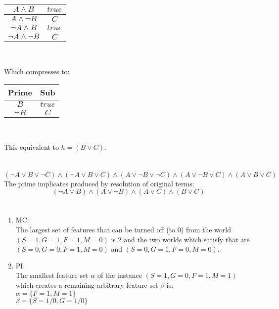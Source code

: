 \documentclass{article}
\begin{document}
\begin{enumerate}
\begin{center}
\begin{tabular}{ |c|c| }
             \hline
             $A \land B$ & $true$ \\
             \hline
             $A \land \lnot B$ & $C$ \\
             \hline
             $\lnot A \land B$ & $true$ \\
             \hline
             $\lnot A \land \lnot B$ & $C$ \\
             \hline
            \end{tabular} \\
    \end{center}
    Which compresses to:
    \begin{center}
           \begin{tabular}{ |c|c| }
            \hline
             Prime&Sub \\ 
             \hline
             $B$ & $true$ \\
             \hline
             $\lnot B$ & $C$ \\
             \hline
            \end{tabular} \\
    \end{center}
    This equivalent to $h = (B \lor C)$.
\end{enumerate}
 \clearpage
 \section{}
 \[(\lnot A \lor B \lor \lnot C) \land (\lnot A \lor B \lor C) \land (A \lor \lnot B \lor \lnot C) \land (A \lor \lnot B \lor C) \land (A \lor B \lor C)\]
 The prime implicates produced by resolution of original terms:
 \[
    (\lnot A \lor B) \land (A \lor \lnot B) \land (A \lor C) \land (B \lor C)
\]
 \clearpage
 \section{}
 \renewcommand{\labelenumi}{}
 \begin{enumerate}
\item MC:\\
 The largest set of features that can be turned off (to 0) from the world $(S=1, G=1, F=1, M=0)$ is 2 and the two worlds which satisfy that are $(S=0, G=0, F=1, M=0)$ and $(S=0, G=1, F=0, M=0)$.
\item PI:\\
The smallest feature set $\alpha$ of the instance $(S=1, G=0, F=1, M=1)$ which creates a remaining arbitrary feature set $\beta$ is: \\
$\alpha = \{F=1, M=1\}$ \\
$\beta = \{S=1/0, G=1/0\}$
\end{enumerate}
 
\end{document}
